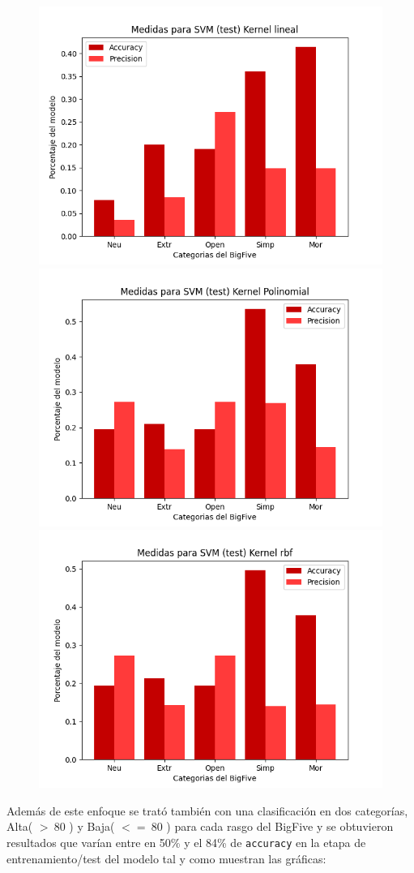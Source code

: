 \documentclass[10pt, a4paper]{article}
\begin{document}
            \begin{figure}[h!]
                \centering
                \includegraphics[width = 0.3\linewidth]{final_lineal10.png}
                \includegraphics[width = 0.3\linewidth]{final_polinomial10.png}
                \includegraphics[width = 0.3\linewidth]{final_rbf10.png}

            \end{figure}

            Adem\'as de este enfoque se trat\'o tambi\'en con una clasificaci\'on en dos categor\'ias, Alta( $>~ 80$ ) y Baja( $<= ~80$ ) para
            cada rasgo del BigFive y se obtuvieron resultados que var\'ian entre en 50\% y el 84\% de \texttt{accuracy} en la etapa 
            de entrenamiento/test del modelo tal y como muestran las gr\'aficas:\\ 
\end{document}
